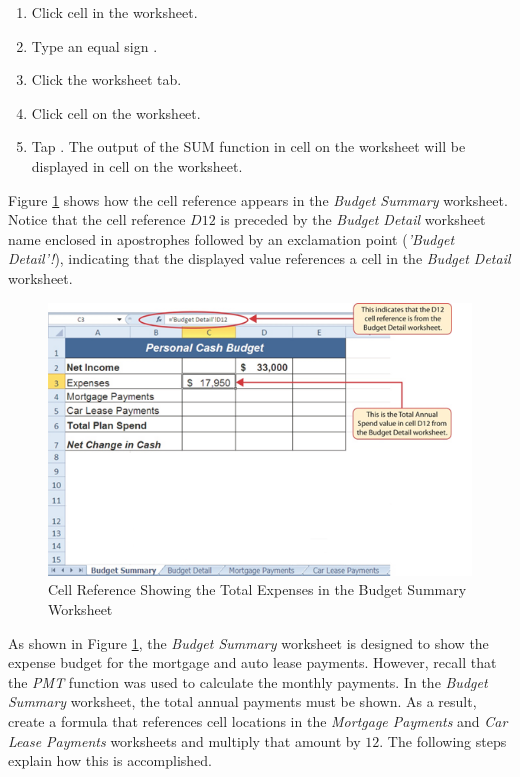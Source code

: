 \begin{enumbox}
	\begin{enumerate}
		\item Click cell  in the  worksheet.
		\item Type an equal sign \fmtTyping{=}.
		\item Click the  worksheet tab.
		\item Click cell  on the  worksheet.
		\item Tap . The output of the SUM function in cell  on the  worksheet will be displayed in cell  on the  worksheet.
	\end{enumerate}
\end{enumbox}

Figure \ref{02:fig36} shows how the cell reference appears in the \textit{Budget Summary} worksheet. Notice that the cell reference $ D12 $ is preceded by the \textit{Budget Detail} worksheet name enclosed in apostrophes followed by an exclamation point (\textit{'Budget Detail'!}), indicating that the displayed value references a cell in the \textit{Budget Detail} worksheet.

\begin{figure}[H]
	\centering
	\includegraphics[width=\maxwidth{.95\linewidth}]{gfx/ch02_fig36}
	\caption{Cell Reference Showing the Total Expenses in the Budget Summary Worksheet}
	\label{02:fig36}
\end{figure}

As shown in Figure \ref{02:fig36}, the \textit{Budget Summary} worksheet is designed to show the expense budget for the mortgage and auto lease payments. However, recall that the \textit{PMT} function was used to calculate the monthly payments. In the \textit{Budget Summary} worksheet, the total annual payments must be shown. As a result, create a formula that references cell locations in the \textit{Mortgage Payments} and \textit{Car Lease Payments} worksheets and multiply that amount by $ 12 $. The following steps explain how this is accomplished.

